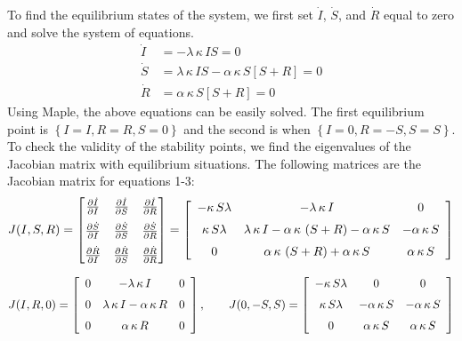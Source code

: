 \documentclass[11pt]{article}
\begin{document}
To find the equilibrium states of the system, we first set $\dot{I}$, $\dot{S}$, and $\dot{R}$ equal to zero and solve the system of equations.
    \begin{align*}
    \dot{I} &= -\lambda\,\kappa\,IS = 0 \\
    \dot{S} &=  \lambda\,\kappa\,IS-\alpha\,\kappa\,S \left[ S+R \right] = 0  
 \\
    \dot{R} &=  \alpha\,\kappa\,S \left[ S+R \right] = 0 
    \end{align*}
Using Maple, the above equations can be easily solved. The first equilibrium point is $\left\{I = I, R = R, S = 0 \right\}$ and the second is when $\left\{I = 0, R = -S, S = S\right\}$. To check the validity of the stability points, we find the eigenvalues of the Jacobian matrix with equilibrium situations. The following matrices are the Jacobian matrix for equations 1-3:
\begin{equation*}
J(I, S, R) =
\begin{bmatrix}
    \frac{\partial \dot{I}}{\partial I}       & \frac{\partial \dot{I}}{\partial S} & \frac{\partial \dot{I}}{\partial R}\\
\noalign{\medskip}\frac{\partial \dot{S}}{\partial I}       & \frac{\partial \dot{S}}{\partial S} & \frac{\partial \dot{S}}{\partial R}\\
\noalign{\medskip}\frac{\partial \dot{R}}{\partial I}       & \frac{\partial \dot{R}}{\partial S} & \frac{\partial \dot{R}}{\partial R}
\end{bmatrix}
=
 \left[ \begin {array}{ccc} -\kappa\,S\lambda&-\lambda\,\kappa\,I&0
\\ \noalign{\medskip}\kappa\,S\lambda&\lambda\,\kappa\,I-\alpha\,
\kappa\, \left( S+R \right) -\alpha\,\kappa\,S&-\alpha\,\kappa\,S
\\ \noalign{\medskip}0&\alpha\,\kappa\, \left( S+R \right) +\alpha\,
\kappa\,S&\alpha\,\kappa\,S\end {array} \right]
\end{equation*}

\begin{equation*}
J(I, R, 0) =
 \left[ \begin {array}{ccc} 0&-\lambda\,\kappa\,I&0
\\ \noalign{\medskip}0&\lambda\,\kappa\,I-\alpha\,\kappa\,R&0
\\ \noalign{\medskip}0&\alpha\,\kappa\,R&0\end {array} \right],
\qquad
J(0, -S, S) =
 \left[ \begin {array}{ccc} -\kappa\,S\lambda&0&0\\ \noalign{\medskip}
\kappa\,S\lambda&-\alpha\,\kappa\,S&-\alpha\,\kappa\,S
\\ \noalign{\medskip}0&\alpha\,\kappa\,S&\alpha\,\kappa\,S\end {array}
 \right] 
\end{equation*}
\end{document}
